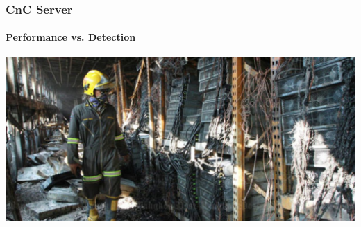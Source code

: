 \documentclass[aspectratio=169]{beamer}
\begin{document}
\begin{frame}
  \frametitle{CnC Server}
  \framesubtitle{Performance vs. Detection}
  \begin{center}
    \includegraphics[width=14cm,keepaspectratio]{server_room_fire}
  \end{center}
\end{frame}
\end{document}
